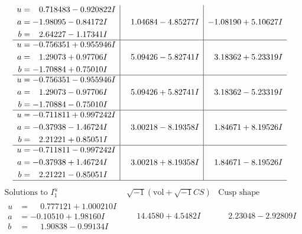 \documentclass[1p]{elsarticle_modified}
\theoremstyle{definition}
\newcommand{\I}{\sqrt{-1}}
\begin{document}
$$\begin{array}{c|c|c}
\begin{aligned}
u &= \phantom{-}0.718483 - 0.920822 I \\
a &= -1.98095 - 0.84172 I \\
b &= \phantom{-}2.64227 - 1.17341 I\end{aligned}
 & \phantom{-}1.04684 - 4.85277 I & -1.08190 + 5.10627 I \\ \hline\begin{aligned}
u &= -0.756351 + 0.955946 I \\
a &= \phantom{-}1.29073 + 0.97706 I \\
b &= -1.70884 + 0.75010 I\end{aligned}
 & \phantom{-}5.09426 - 5.82741 I & \phantom{-}3.18362 + 5.23319 I \\ \hline\begin{aligned}
u &= -0.756351 - 0.955946 I \\
a &= \phantom{-}1.29073 - 0.97706 I \\
b &= -1.70884 - 0.75010 I\end{aligned}
 & \phantom{-}5.09426 + 5.82741 I & \phantom{-}3.18362 - 5.23319 I \\ \hline\begin{aligned}
u &= -0.711811 + 0.997242 I \\
a &= -0.37938 - 1.46724 I \\
b &= \phantom{-}2.21221 + 0.85051 I\end{aligned}
 & \phantom{-}3.00218 - 8.19358 I & \phantom{-}1.84671 + 8.19526 I \\ \hline\begin{aligned}
u &= -0.711811 - 0.997242 I \\
a &= -0.37938 + 1.46724 I \\
b &= \phantom{-}2.21221 - 0.85051 I\end{aligned}
 & \phantom{-}3.00218 + 8.19358 I & \phantom{-}1.84671 - 8.19526 I\\
 \hline 
 \end{array}$$\newpage$$\begin{array}{c|c|c}  
\text{Solutions to }I^u_{1}& \I (\text{vol} + \sqrt{-1}CS) & \text{Cusp shape}\\
 \hline 
\begin{aligned}
u &= \phantom{-}0.777121 + 1.000210 I \\
a &= -0.10510 + 1.98160 I \\
b &= \phantom{-}1.90838 - 0.99134 I\end{aligned}
 & \phantom{-}14.4580 + 4.5482 I & \phantom{-}2.23048 - 2.92809 I \\ \hline\begin{aligned}

\end{aligned}
\end{array}$$
\end{document}
